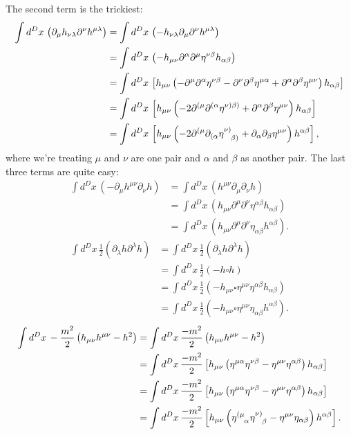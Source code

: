 \documentclass{book}
\theoremstyle{definition}
\newcommand{\p}{\partial}
\newcommand{\nn}{\nonumber}
\newcommand{\f}[2]{\frac{#1}{#2}}
\newcommand{\lp}{\left(}
\newcommand{\rp}{\right)}
\newcommand{\lb}{\left[}
\newcommand{\rb}{\right]}
\begin{document}
The second term is the trickiest:
\begin{align}
\int d^Dx\, \lp\p_\mu h_{\nu\lambda}\p^\nu h^{\mu\lambda}\rp &= \int d^Dx\, \lp - h_{\nu\lambda}\p_\mu \p^\nu h^{\mu\lambda}\rp \nn\\
&= \int d^Dx\, \lp -h_{\mu\nu}\p^\alpha \p^\mu \eta^{\nu\beta}h_{\alpha\beta} \rp\nn\\
&= \int d^Dx\, \lb h_{\mu\nu}\lp - \p^\mu \p^\alpha \eta^{\nu\beta} - \p^\nu \p^\beta \eta^{\mu\alpha} + \p^\alpha \p^\beta \eta^{\mu\nu}  \rp h_{\alpha\beta} \rb\nn\\
&= \int d^Dx\, \lb h_{\mu\nu} \lp -2\p^{(\mu} \p^{(\alpha} \tensor{\eta}{^{\nu)\beta)}} + \p^\alpha \p^\beta \eta^{\mu\nu}  \rp h_{\alpha\beta} \rb\nn\\
&= \int d^Dx\, \lb h_{\mu\nu} \lp -2\p^{(\mu} \p_{(\alpha} \tensor{\eta}{^{\nu)}_{\beta)}} + \p_\alpha \p_\beta \eta^{\mu\nu}  \rp h^{\alpha\beta} \rb,
\end{align}
where we're treating $\mu$ and $\nu$ are one pair and $\alpha$ and $\beta$ as another pair. The last three terms are quite easy:
\begin{align}
\int d^Dx\, \lp-\p_\mu h^{\mu\nu}\p_\nu h \rp 
&= \int d^Dx\, \lp h^{\mu\nu}\p_\mu\p_\nu h \rp  \nn\\
&= \int d^Dx\, \lp h_{\mu\nu}\p^\mu\p^\nu \eta^{\alpha\beta}h_{\alpha\beta} \rp  \nn\\
&= \int d^Dx\, \lp h_{\mu\nu}\p^\mu\p^\nu \eta_{\alpha\beta}h^{\alpha\beta} \rp.
\end{align}
\begin{align}
\int d^Dx\, \f{1}{2}\lp \p_\lambda h \p^\lambda h \rp
&= \int d^Dx\, \f{1}{2}\lp \p_\lambda h \p^\lambda h \rp\nn\\ 
&= \int d^Dx\, \f{1}{2}\lp -h\square h \rp\nn\\
&= \int d^Dx\, \f{1}{2}\lp -h_{\mu\nu}\square \eta^{\mu\nu}\eta^{\alpha\beta}h_{\alpha\beta} \rp\nn\\
&= \int d^Dx\, \f{1}{2}\lp -h_{\mu\nu}\square \eta^{\mu\nu}\eta_{\alpha\beta}h^{\alpha\beta} \rp.
\end{align}
\begin{align}
\int d^Dx\, -\f{m^2}{2}\lp h_{\mu\nu}h^{\mu\nu} - h^2 \rp
&= \int d^Dx\, \f{-m^2}{2}\lp h_{\mu\nu}h^{\mu\nu} - h^2 \rp\nn\\
&= \int d^Dx\, \f{-m^2}{2}\lb h_{\mu\nu}\lp\eta^{\mu\alpha}\eta^{\nu\beta}  - \eta^{\mu\nu}\eta^{\alpha\beta}\rp h_{\alpha\beta}  \rb \nn\\
&= \int d^Dx\, \f{-m^2}{2}\lb h_{\mu\nu}\lp\eta^{\mu\alpha}\eta^{\nu\beta}  - \eta^{\mu\nu}\eta^{\alpha\beta}\rp h_{\alpha\beta}  \rb \nn\\
&= \int d^Dx\, \f{-m^2}{2}\lb h_{\mu\nu}\lp\tensor{\eta}{^{(\mu}_\alpha}\tensor{\eta}{^{\nu)}_\beta}  - \eta^{\mu\nu}\eta_{\alpha\beta}\rp h^{\alpha\beta}  \rb.
\end{align}
\end{document}
